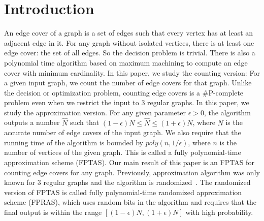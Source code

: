 \section{Introduction}
An edge cover of a graph is a set of edges such that every vertex has at least an adjacent edge in it.
 For any graph without isolated vertices, there is at least one edge cover: the set of all edges. So the decision problem is trivial. There is also a polynomial time algorithm based on maximum machining to compute an edge cover with minimum cardinality.     In this paper, we study the counting version:
 For a given input graph, we count the number of edge covers for that graph. Unlike the decision or optimization problem, counting edge covers is a \#P-complete problem even when we restrict the input to 3 regular graphs. In this paper, we study the approximation version. For any given parameter $\epsilon>0$, the algorithm outputs a number $\hat{N}$ such that $(1-\epsilon) N\leq \hat{N} \leq (1+\epsilon) N$, where $N$ is the accurate number of edge covers of the input graph. We also require that the running time of the algorithm is bounded by $poly(n,1/\epsilon)$, where $n$ is the number of vertices of the given graph. This is called a fully polynomial-time approximation scheme (FPTAS). Our main result of this paper is an FPTAS for counting edge covers for any graph. Previously, approximation algorithm was only known for 3 regular graphs and the algorithm is randomized~\cite{MFCS09}. The randomized version of FPTAS is called fully polynomial-time randomized approximation scheme (FPRAS), which uses random bits in the algorithm and requires that the final output is within the range $[(1-\epsilon) N, (1+\epsilon) N]$ with high probability.

